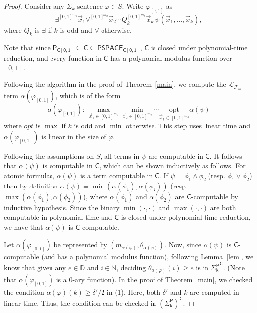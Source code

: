 \documentclass[conference]{IEEEtran}
\begin{document}
\begin{proof} Consider any $\Sigma_k$-sentence $\varphi\in S$. Write $\varphi_{[0,1]}$ as
$$\exists^{[0,1]^{m_1}} \vec x_1\forall^{[0,1]^{m_2}}\vec x_2\cdots Q_k^{[0,1]^{m_k}}\vec x_k\ \psi(\vec x_1,...,\vec x_k),$$
where $Q_k$ is $\exists$ if $k$ is odd and $\forall$ otherwise. 

Note that since $\mathsf{P_{C[0,1]}}\subseteq \mathsf{C}\subseteq \mathsf{PSPACE_{C[0,1]}}$, $\mathsf{C}$ is closed under polynomial-time reduction, and every function in $\mathsf{C}$ has a polynomial modulus function over $[0,1]$. 

Following the algorithm in the proof of Theorem~\ref{main}, we compute the $\mathcal{L}_{\mathcal{F}_m}$-term $\alpha(\varphi_{[0,1]})$, which is of the form
$$\alpha(\varphi_{[0,1]}):\ \max_{\vec x_1\in [0,1]^{m_1}}\min_{\vec x_2\in [0,1]^{m_2}}\cdots\underset{\vec x_k\in [0,1]^{m_k}}{\mbox{opt}}\alpha(\psi)$$
where $\mathit{opt}$ is $\max$ if $k$ is odd and $\min$ otherwise. This step uses linear time and $\alpha(\varphi_{[0,1]})$ is linear in the size of $\varphi$.

Following the assumptions on $S$, all terms in $\psi$ are computable in $\mathsf{C}$. It follows that $\alpha(\psi)$ is computable in $\mathsf{C}$, which can be shown inductively as follows. For atomic formulas, $\alpha(\psi)$ is a term computable in $\mathsf{C}$. If $\psi = \phi_1\wedge \phi_2$ (resp. $\phi_1\vee \phi_2$) then by definition $\alpha(\psi) = \min(\alpha(\phi_1), \alpha(\phi_2))$ (resp. $\max(\alpha(\phi_1), \alpha(\phi_2))$), where $\alpha(\phi_1)$ and $\alpha(\phi_2)$ are $\mathsf{C}$-computable by inductive hypothesis. Since the binary $\min(\cdot,\cdot)$ and $\max(\cdot, \cdot)$ are both computable in polynomial-time and $\mathsf{C}$ is closed under polynomial-time reduction, we have that $\alpha(\psi)$ is $\mathsf{C}$-computable. 

Let $\alpha(\varphi_{[0,1]})$ be represented by $(m_{\alpha(\varphi)},\theta_{\alpha(\varphi)})$. Now, since $\alpha(\psi)$ is $\mathsf{C}$-computable (and has a polynomial modulus function), following Lemma~\ref{lem}, we know that given any $e\in \mathbb{D}$ and $i\in \mathbb{N}$, deciding $\theta_{\alpha(\varphi)}(i)\geq e$ is in $\mathsf{{\Sigma_k^P}^C}$. (Note that $\alpha(\varphi_{[0,1]})$ is a 0-ary function). In the proof of Theorem~\ref{main}, we checked the condition $\alpha(\varphi)(k)\geq \delta'/2$ in (1). Here, both $\delta'$ and $k$ are computed in linear time. Thus, the condition can be checked in $\mathsf{(\Sigma_k^P)^C}$. 


\end{proof}
\end{document}
